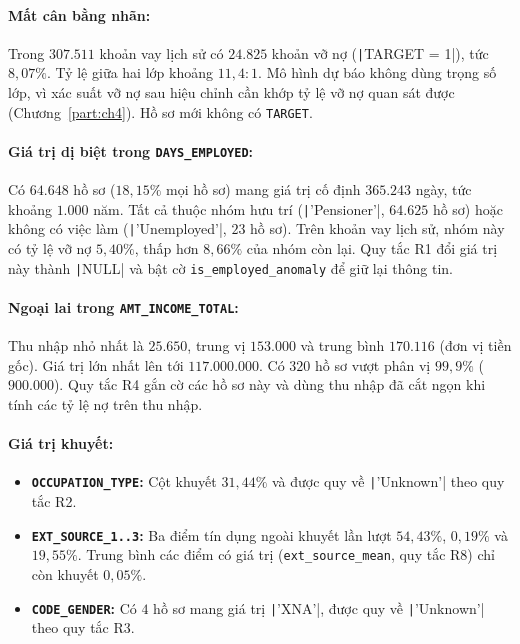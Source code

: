 \paragraph{Mất cân bằng nhãn:}
Trong $307.511$ khoản vay lịch sử có $24.825$ khoản vỡ nợ (\texttt|TARGET = 1|), tức $8{,}07\%$. Tỷ lệ giữa hai lớp khoảng $11{,}4 : 1$. Mô hình dự báo không dùng trọng số lớp, vì xác suất vỡ nợ sau hiệu chỉnh cần khớp tỷ lệ vỡ nợ quan sát được (Chương~\ref{part:ch4}). Hồ sơ mới không có \texttt{TARGET}.

\paragraph{Giá trị dị biệt trong \texttt{DAYS\_EMPLOYED}:}
Có $64.648$ hồ sơ ($18{,}15\%$ mọi hồ sơ) mang giá trị cố định $365.243$ ngày, tức khoảng $1.000$ năm. Tất cả thuộc nhóm hưu trí (\texttt|'Pensioner'|, $64.625$ hồ sơ) hoặc không có việc làm (\texttt|'Unemployed'|, $23$ hồ sơ). Trên khoản vay lịch sử, nhóm này có tỷ lệ vỡ nợ $5{,}40\%$, thấp hơn $8{,}66\%$ của nhóm còn lại. Quy tắc R1 đổi giá trị này thành \texttt|NULL| và bật cờ \texttt{is\_employed\_anomaly} để giữ lại thông tin.

\paragraph{Ngoại lai trong \texttt{AMT\_INCOME\_TOTAL}:}
Thu nhập nhỏ nhất là $25.650$, trung vị $153.000$ và trung bình $170.116$ (đơn vị tiền gốc). Giá trị lớn nhất lên tới $117.000.000$. Có $320$ hồ sơ vượt phân vị $99{,}9\%$ ($900.000$). Quy tắc R4 gắn cờ các hồ sơ này và dùng thu nhập đã cắt ngọn khi tính các tỷ lệ nợ trên thu nhập.

\paragraph{Giá trị khuyết:}
\begin{itemize}[topsep=0pt, itemsep=1pt]
	\item \textbf{\texttt{OCCUPATION\_TYPE}:} Cột khuyết $31{,}44\%$ và được quy về \texttt|'Unknown'| theo quy tắc R2.
	\item \textbf{\texttt{EXT\_SOURCE\_1..3}:} Ba điểm tín dụng ngoài khuyết lần lượt $54{,}43\%$, $0{,}19\%$ và $19{,}55\%$. Trung bình các điểm có giá trị (\texttt{ext\_source\_mean}, quy tắc R8) chỉ còn khuyết $0{,}05\%$.
	\item \textbf{\texttt{CODE\_GENDER}:} Có $4$ hồ sơ mang giá trị \texttt|'XNA'|, được quy về \texttt|'Unknown'| theo quy tắc R3.
\end{itemize}

